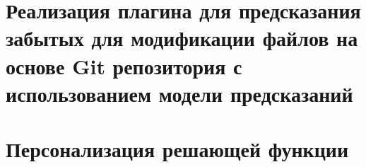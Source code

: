 \documentclass[times,specification,annotation]{itmo-student-thesis}
\begin{document}
\chapter{Реализация плагина для предсказания забытых для модификации файлов на основе Git репозитория с использованием модели предсказаний}\label{chapter4}


\startconclusionpage


\printmainbibliography

\appendix

\chapter{Персонализация решающей функции}

\end{document}

